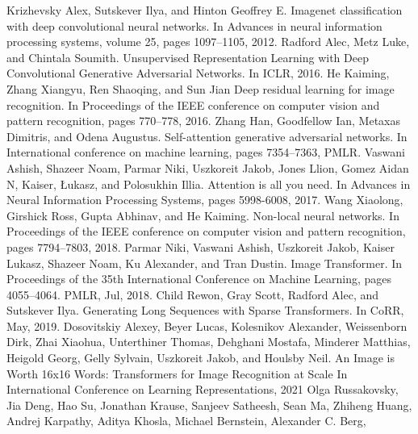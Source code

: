 \clearpage
\newpage
\begin{thebibliography}{9}
  Krizhevsky Alex, Sutskever Ilya, and Hinton Geoffrey E.
  Imagenet classification with deep convolutional neural networks.
  In Advances in neural information processing systems,
  volume 25, pages 1097--1105, 2012.
  Radford Alec, Metz Luke, and Chintala Soumith.
  Unsupervised Representation Learning with Deep Convolutional 
  Generative Adversarial Networks. In ICLR, 2016.
  He Kaiming, Zhang Xiangyu, Ren Shaoqing, and Sun Jian
  Deep residual learning for image recognition.
  In Proceedings of the IEEE conference on computer vision and pattern recognition,
  pages 770--778, 2016.
  Zhang Han, Goodfellow Ian, Metaxas Dimitris, and Odena Augustus.
  Self-attention generative adversarial networks.
  In International conference on machine learning, pages 7354--7363, PMLR.
  Vaswani Ashish, Shazeer Noam, Parmar Niki, Uszkoreit Jakob, Jones Llion, 
  Gomez Aidan N, Kaiser, {\L}ukasz, and Polosukhin Illia.
  Attention is all you need.
  In Advances in Neural Information Processing Systems, pages 5998-6008, 2017.
  Wang Xiaolong, Girshick Ross, Gupta Abhinav, and He Kaiming.
  Non-local neural networks.
  In Proceedings of the IEEE conference on computer vision and pattern recognition,
  pages 7794--7803, 2018.
   Parmar Niki, Vaswani Ashish,
  Uszkoreit Jakob, Kaiser Lukasz, Shazeer Noam, Ku Alexander, and Tran Dustin.
  Image Transformer.
  In Proceedings of the 35th International Conference on Machine Learning,
  pages 4055--4064. PMLR, Jul, 2018.
   Child Rewon, Gray Scott, Radford Alec, 
  and Sutskever Ilya.
  Generating Long Sequences with Sparse Transformers. 
  In CoRR, May, 2019.
  Dosovitskiy Alexey, Beyer Lucas, Kolesnikov Alexander, Weissenborn Dirk, Zhai Xiaohua, 
  Unterthiner Thomas, Dehghani Mostafa, Minderer Matthias, Heigold Georg, Gelly Sylvain, 
  Uszkoreit Jakob, and Houlsby Neil.
  An Image is Worth 16x16 Words: Transformers for Image Recognition at Scale
  In International Conference on Learning Representations, 2021
  Olga Russakovsky, Jia Deng, Hao Su, Jonathan Krause, Sanjeev Satheesh, Sean Ma,
  Zhiheng Huang, Andrej Karpathy, Aditya Khosla, Michael Bernstein, Alexander C. Berg, 

\end{thebibliography}
